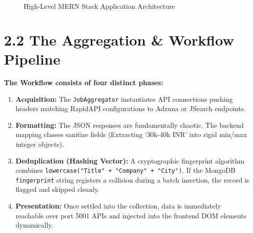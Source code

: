 \documentclass[12pt,a4paper,oneside]{report}
\begin{document}
\vspace{0.5cm}
\begin{figure}[H]
    \centering
    \caption{High-Level MERN Stack Application Architecture}
    \label{fig:highlevel_arch}
\end{figure}

\section{2.2 The Aggregation \& Workflow Pipeline}
\textbf{The Workflow consists of four distinct phases:}
\begin{enumerate}
    \item \textbf{Acquisition:} The \texttt{JobAggregator} instantiates API connections pushing headers matching RapidAPI configurations to Adzuna or JSearch endpoints.
    \item \textbf{Formatting:} The JSON responses are fundamentally chaotic. The backend mapping classes sanitize fields (Extracting `30k-40k INR' into rigid min/max integer objects).
    \item \textbf{Deduplication (Hashing Vector):}
    A cryptographic fingerprint algorithm combines \texttt{lowercase("Title" + "Company" + "City")}. If the MongoDB \texttt{fingerprint} string registers a collision during a batch insertion, the record is flagged and skipped cleanly.
    \item \textbf{Presentation:} Once settled into the collection, data is immediately reachable over port 5001 APIs and injected into the frontend DOM elements dynamically.
\end{enumerate}
\end{document}
